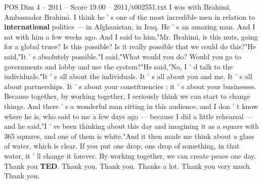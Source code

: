 \begin{textsample}{POS Dim 4 – 2011 – Score 19.00 – 2011/t002551.txt}
I was with Brahimi, Ambassador Brahimi.
I think he ' s one of the most incredible men in relation to \textbf{international} politics — in Afghanistan, in Iraq.
He ' s an amazing man.
And I sat with him a few weeks ago.
And I said to him,"Mr.
Brahimi, is this nuts, going for a global truce?
Is this possible?
Is it really possible that we could do this?"He said,"It ' s absolutely possible."I said,"What would you do?
Would you go to governments and lobby and use the system?"He said,"No, I ' d talk to the individuals."It ' s all about the individuals.
It ' s all about you and me.
It ' s all about partnerships.
It ' s about your constituencies ; it ' s about your businesses.
Because together, by working together, I seriously think we can start to change things.
And there ' s a wonderful man sitting in this audience, and I don ' t know where he is, who said to me a few days ago — because I did a little rehearsal — and he said,"I ' ve been thinking about this day and imagining it as a square with 365 squares, and one of them is white."And it then made me think about a glass of water, which is clear.
If you put one drop, one drop of something, in that water, it ' ll change it forever.
By working together, we can create peace one day.
Thank you \textbf{TED}.
Thank you.
Thank you.
Thanks a lot.
Thank you very much.
Thank you.

\end{textsample}
